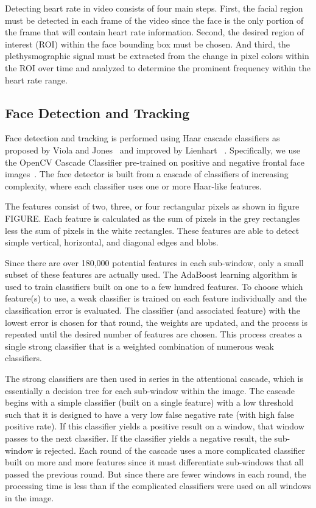 \documentclass[10pt,twocolumn,letterpaper]{article}
\begin{document}
Detecting heart rate in video consists of four main steps. First, the facial region must be detected in each frame of the video since the face is the only portion of the frame that will contain heart rate information. Second, the desired region of interest (ROI) within the face bounding box must be chosen. And third, the plethysmographic signal must be extracted from the change in pixel colors within the ROI over time and analyzed to determine the prominent frequency within the heart rate range.

\subsection{Face Detection and Tracking}

Face detection and tracking is performed using Haar cascade classifiers as proposed by Viola and Jones~\cite{Viola:2001aa} and improved by Lienhart \etal~\cite{Leinhart:2002aa}. Specifically, we use the OpenCV Cascade Classifier pre-trained on positive and negative frontal face images~\cite{opencv_library}. The face detector is built from a cascade of classifiers of increasing complexity, where each classifier uses one or more Haar-like features.

The features consist of two, three, or four rectangular pixels as shown in figure FIGURE. Each feature is calculated as the sum of pixels in the grey rectangles less the sum of pixels in the white rectangles. These features are able to detect simple vertical, horizontal, and diagonal edges and blobs. 

Since there are over 180,000 potential features in each sub-window, only a small subset of these features are actually used. The AdaBoost learning algorithm is used to train classifiers built on one to a few hundred features. To choose which feature(s) to use, a weak classifier is trained on each feature individually and the classification error is evaluated. The classifier (and associated feature) with the lowest error is chosen for that round, the weights are updated, and the process is repeated until the desired number of features are chosen. This process creates a single strong classifier that is a weighted combination of numerous weak classifiers.

The strong classifiers are then used in series in the attentional cascade, which is essentially a decision tree for each sub-window within the image. The cascade begins with a simple classifier (built on a single feature) with a low threshold such that it is designed to have a very low false negative rate (with high false positive rate). If this classifier yields a positive result on a window, that window passes to the next classifier. If the classifier yields a negative result, the sub-window is rejected. Each round of the cascade uses a more complicated classifier built on more and more features since it must differentiate sub-windows that all passed the previous round. But since there are fewer windows in each round, the processing time is less than if the complicated classifiers were used on all windows in the image.
\end{document}
